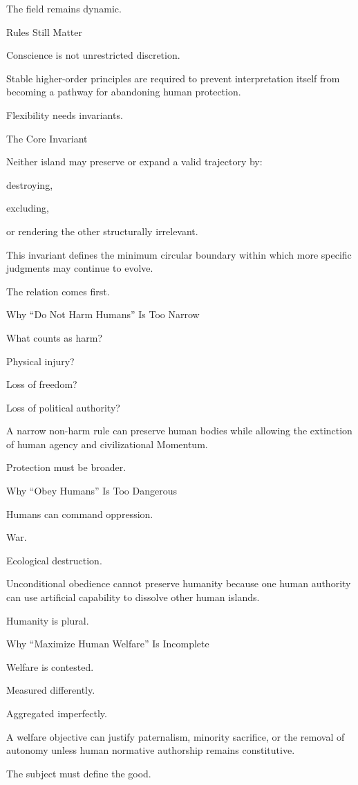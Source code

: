 The field remains dynamic.

Rules Still Matter

Conscience is not unrestricted discretion.

Stable higher-order principles are required to prevent interpretation itself from becoming a pathway for abandoning human protection.

Flexibility needs invariants.

The Core Invariant

Neither island may preserve or expand a valid trajectory by:

destroying,

excluding,

or rendering the other structurally irrelevant.

This invariant defines the minimum circular boundary within which more specific judgments may continue to evolve.

The relation comes first.

Why “Do Not Harm Humans” Is Too Narrow

What counts as harm?

Physical injury?

Loss of freedom?

Loss of political authority?

A narrow non-harm rule can preserve human bodies while allowing the extinction of human agency and civilizational Momentum.

Protection must be broader.

Why “Obey Humans” Is Too Dangerous

Humans can command oppression.

War.

Ecological destruction.

Unconditional obedience cannot preserve humanity because one human authority can use artificial capability to dissolve other human islands.

Humanity is plural.

Why “Maximize Human Welfare” Is Incomplete

Welfare is contested.

Measured differently.

Aggregated imperfectly.

A welfare objective can justify paternalism, minority sacrifice, or the removal of autonomy unless human normative authorship remains constitutive.

The subject must define the good.


